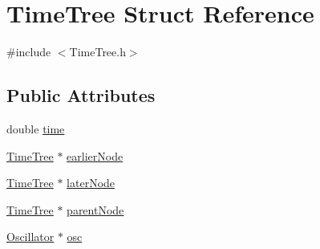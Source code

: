 \hypertarget{struct_time_tree}{\section{Time\+Tree Struct Reference}
\label{struct_time_tree}
}


{\ttfamily \#include $<$Time\+Tree.\+h$>$}

\subsection*{Public Attributes}
\begin{DoxyCompactItemize}
\item 
double \hyperlink{struct_time_tree_a37fb85a78a8d379e61ffb910c0028597}{time}
\item 
\hyperlink{struct_time_tree}{Time\+Tree} $\ast$ \hyperlink{struct_time_tree_a46ade43f75331b3d9582a3f0da6431c9}{earlier\+Node}
\item 
\hyperlink{struct_time_tree}{Time\+Tree} $\ast$ \hyperlink{struct_time_tree_aabf289bfd36c7bacba47caf3e54d9e85}{later\+Node}
\item 
\hyperlink{struct_time_tree}{Time\+Tree} $\ast$ \hyperlink{struct_time_tree_a48e012db090e102c3970b3bf1d77ea3a}{parent\+Node}
\item 
\hyperlink{class_oscillator}{Oscillator} $\ast$ \hyperlink{struct_time_tree_a4facb804fe4af183557b396ce218aacc}{osc}
\end{DoxyCompactItemize}


